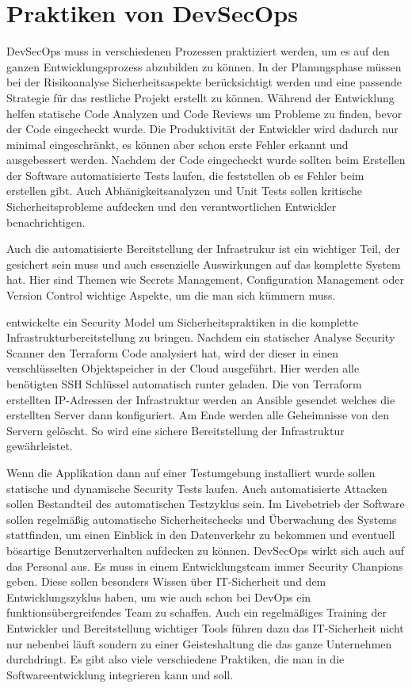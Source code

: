 \section{Praktiken von DevSecOps}
DevSecOps muss in verschiedenen Prozessen praktiziert werden, um es auf den ganzen Entwicklungsprozess abzubilden zu können.
In der Planungsphase müssen bei der Risikoanalyse Sicherheitsaspekte berücksichtigt werden und eine passende Strategie für das restliche Projekt erstellt zu können.
Während der Entwicklung helfen statische Code Analyzen und Code Reviews um Probleme zu finden, bevor der Code eingecheckt wurde. Die Produktivität der Entwickler wird dadurch nur minimal eingeschränkt, es können aber schon erste Fehler erkannt und ausgebessert werden.
Nachdem der Code eingecheckt wurde sollten beim Erstellen der Software automatisierte Tests laufen, die feststellen ob es Fehler beim erstellen gibt. Auch Abhänigkeitsanalyzen und Unit Tests sollen kritische Sicherheitsprobleme aufdecken und den verantwortlichen Entwickler benachrichtigen.

Auch die automatisierte Bereitstellung der Infrastrukur ist ein wichtiger Teil, der gesichert sein muss und auch essenzielle Auswirkungen auf das komplette System hat.
Hier sind Themen wie Secrets Management, Configuration Management oder Version Control wichtige Aspekte, um die man sich kümmern muss.\cite{grey}

\cite{security-model} entwickelte ein Security Model um Sicherheitspraktiken in die komplette Infrastrukturbereitstellung zu bringen. Nachdem ein statischer Analyse Security Scanner den Terraform Code analysiert hat, wird der dieser in einen verschlüsselten Objektspeicher in der Cloud ausgeführt. Hier werden alle benötigten SSH Schlüssel automatisch runter geladen. Die von Terraform erstellten IP-Adressen der Infrastruktur werden an Ansible gesendet welches die erstellten Server dann konfiguriert. Am Ende werden alle Geheimnisse von den Servern gelöscht. So wird eine sichere Bereitstellung der Infrastruktur gewährleistet.

Wenn die Applikation dann auf einer Testumgebung installiert wurde sollen statische und dynamische Security Tests laufen. Auch automatisierte Attacken sollen Bestandteil des automatischen Testzyklus sein.
Im Livebetrieb der Software sollen regelmäßig automatische Sicherheitschecks und Überwachung des Systems stattfinden, um einen Einblick in den Datenverkehr zu bekommen und eventuell bösartige Benutzerverhalten aufdecken zu können.
DevSecOps wirkt sich auch auf das Personal aus. Es muss in einem Entwicklungsteam immer \glqq Security Chanpions\grqq \cite{grey} geben. Diese sollen besonders Wissen über IT-Sicherheit und dem Entwicklungszyklus haben, um wie auch schon bei DevOps ein funktionsübergreifendes Team zu schaffen.
Auch ein regelmäßiges Training der Entwickler und Bereitstellung wichtiger Tools führen dazu das IT-Sicherheit nicht nur nebenbei läuft sondern zu einer Geisteshaltung die das ganze Unternehmen durchdringt.
Es gibt also viele verschiedene Praktiken, die man in die Softwareentwicklung integrieren kann und soll.

